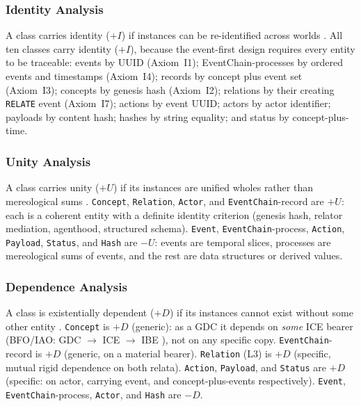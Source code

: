 \subsubsection{Identity Analysis}\label{subsubsec:ontoclean-identity}

A class carries identity ($+I$) if instances can be re-identified across worlds \cite{ontoclean,guarino2000identity}. All ten classes carry identity ($+I$), because the event-first design requires every entity to be traceable: events by UUID (Axiom~I1); EventChain-processes by ordered events and timestamps (Axiom~I4); records by concept plus event set (Axiom~I3); concepts by genesis hash (Axiom~I2); relations by their creating \texttt{RELATE} event (Axiom~I7); actions by event UUID; actors by actor identifier; payloads by content hash; hashes by string equality; and status by concept-plus-time.

\subsubsection{Unity Analysis}\label{subsubsec:ontoclean-unity}

A class carries unity ($+U$) if its instances are unified wholes rather than mereological sums \cite{ontoclean}. \texttt{Concept}, \texttt{Relation}, \texttt{Actor}, and \texttt{EventChain}-record are $+U$: each is a coherent entity with a definite identity criterion (genesis hash, relator mediation, agenthood, structured schema). \texttt{Event}, \texttt{EventChain}-process, \texttt{Action}, \texttt{Payload}, \texttt{Status}, and \texttt{Hash} are $-U$: events are temporal slices, processes are mereological sums of events, and the rest are data structures or derived values.

\subsubsection{Dependence Analysis}\label{subsubsec:ontoclean-dependence}

A class is existentially dependent ($+D$) if its instances cannot exist without some other entity \cite{fine1995ontologicaldependence,ontoclean}. \texttt{Concept} is $+D$ (generic): as a GDC it depends on \emph{some} ICE bearer (BFO/IAO: GDC $\rightarrow$ ICE $\rightarrow$ IBE \cite{smith2012ontology,limbaugh2024cyber}), not on any specific copy. \texttt{EventChain}-record is $+D$ (generic, on a material bearer). \texttt{Relation} (L3) is $+D$ (specific, mutual rigid dependence on both relata). \texttt{Action}, \texttt{Payload}, and \texttt{Status} are $+D$ (specific: on actor, carrying event, and concept-plus-events respectively). \texttt{Event}, \texttt{EventChain}-process, \texttt{Actor}, and \texttt{Hash} are $-D$.

